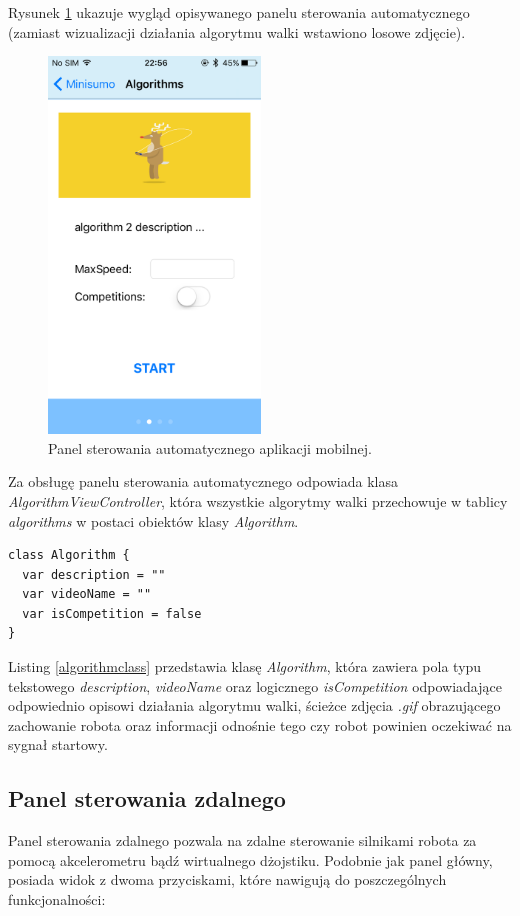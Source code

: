 Rysunek \ref{fig:automaticview} ukazuje wygląd opisywanego panelu sterowania automatycznego (zamiast wizualizacji działania algorytmu walki wstawiono losowe zdjęcie). 

\begin{figure}[H]
	\centering
		\includegraphics[width=0.75\linewidth, height=10cm, keepaspectratio, fbox]{pic05/algorithm.PNG}
	\caption{Panel sterowania automatycznego aplikacji mobilnej.}
	\label{fig:automaticview}	
\end{figure}

Za obsługę panelu sterowania automatycznego  odpowiada klasa 	\textit{AlgorithmViewController}, która wszystkie algorytmy walki przechowuje w tablicy \textit{algorithms} w postaci obiektów klasy \textit{Algorithm}.
  
\begin{minipage}{\textwidth}
	\begin{lstlisting}[label=algorithmclass,caption=Klasa Algorithm.]
class Algorithm {
  var description = ""
  var videoName = ""
  var isCompetition = false
}
	\end{lstlisting}
\end{minipage}

Listing \ref{algorithmclass} przedstawia klasę \textit{Algorithm}, która zawiera pola typu tekstowego \textit{description}, \textit{videoName} oraz logicznego \textit{isCompetition} odpowiadające odpowiednio opisowi działania algorytmu walki, ścieżce zdjęcia \textit{.gif} obrazującego zachowanie robota oraz informacji odnośnie tego czy robot powinien oczekiwać na sygnał startowy.
 
\subsection{Panel sterowania zdalnego}
Panel sterowania zdalnego pozwala na zdalne sterowanie silnikami robota za pomocą akcelerometru bądź wirtualnego dżojstiku. Podobnie jak panel główny, posiada  widok z dwoma przyciskami, które nawigują do poszczególnych funkcjonalności:
 

